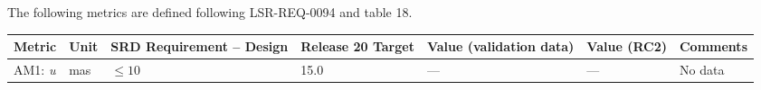 \documentclass[DM,lsstdraft,toc]{lsstdoc}
\begin{document}
The following metrics are defined following LSR-REQ-0094
 and  table 18.

\begin{longtable}[]{@{}lllllll@{}}
\toprule
\begin{minipage}[b]{0.12\columnwidth}\raggedright\strut
Metric\strut
\end{minipage} & \begin{minipage}[b]{0.06\columnwidth}\raggedright\strut
Unit\strut
\end{minipage} & \begin{minipage}[b]{0.14\columnwidth}\raggedright\strut
SRD Requirement -- Design\strut
\end{minipage} & \begin{minipage}[b]{0.14\columnwidth}\raggedright\strut
Release 20 Target\strut
\end{minipage} & \begin{minipage}[b]{0.12\columnwidth}\raggedright\strut
Value (validation data)\strut
\end{minipage} & \begin{minipage}[b]{0.12\columnwidth}\raggedright\strut
Value (RC2) \strut
\end{minipage} & \begin{minipage}[b]{0.17\columnwidth}\raggedright\strut
Comments\strut
\end{minipage}\tabularnewline
\midrule
\endhead
\begin{minipage}[t]{0.12\columnwidth}\raggedright\strut
AM1: \emph{u}\strut
\end{minipage} & \begin{minipage}[t]{0.06\columnwidth}\raggedright\strut
mas\strut
\end{minipage} & \begin{minipage}[t]{0.14\columnwidth}\raggedright\strut
\(\leq 10\)\strut
\end{minipage} & \begin{minipage}[t]{0.14\columnwidth}\raggedright\strut
15.0\strut
\end{minipage} & \begin{minipage}[t]{0.12\columnwidth}\raggedright\strut
---\strut
\end{minipage} & \begin{minipage}[t]{0.12\columnwidth}\raggedright\strut
--- \strut
\end{minipage} & \begin{minipage}[t]{0.17\columnwidth}\raggedright\strut
No data\strut
\end{minipage}\tabularnewline

\end{longtable}
\end{document}
